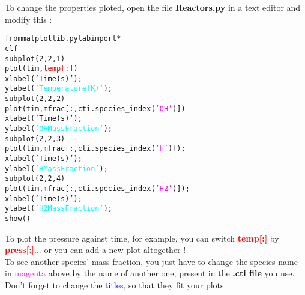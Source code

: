 \documentclass[a4paper,11pt]{article}
\begin{document}
To change the properties ploted, open the file \textbf{Reactors.py} in a text editor and modify this : 
\newpage
\begin{alltt}
        from matplotlib.pylab import *
        clf
        subplot(2,2,1)
        plot(tim,\textcolor{red}{temp[:]})
        xlabel('Time (s)');
        ylabel(\textcolor{cyan}{'Temperature (K)'});
        subplot(2,2,2)
        plot(tim,mfrac[:,cti.species_index(\textcolor{magenta}{'OH'})])
        xlabel('Time (s)');
        ylabel(\textcolor{cyan}{'OH Mass Fraction'});
        subplot(2,2,3)
        plot(tim,mfrac[:,cti.species_index(\textcolor{magenta}{'H'})]);
        xlabel('Time (s)');
        ylabel(\textcolor{cyan}{'H Mass Fraction'});
        subplot(2,2,4)
        plot(tim,mfrac[:,cti.species_index(\textcolor{magenta}{'H2'})]);
        xlabel('Time (s)');
        ylabel(\textcolor{cyan}{'H2 Mass Fraction'});
        show()
\end{alltt}

To plot the pressure against time, for example, you can switch \textcolor{red}{\textbf{temp[:]}} by \textcolor{red}{\textbf{press[:]}}... or you can add a new plot altogether !  \\

To see another species' mass fraction, you just have to change the species name in \textcolor{magenta}{magenta} above by the name of another one, present in the \textbf{.cti file} you use.\\

Don't forget to change the \textcolor{blue}{titles}, so that they fit your plots.
\end{document}
